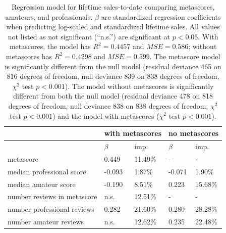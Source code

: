 \documentclass{sig-alternate}
\begin{document}
\begin{table}[tb]
\centering
\small
\sffamily

\begin{tabularx}{\linewidth}{llXlX}
& \multicolumn{2}{c}{\textbf{with metascores}} & \multicolumn{2}{c}{\textbf{no metascores}}\\ 
\midrule & \textbf{$\beta$} & imp. & \textbf{$\beta$} & imp.\\ 
metascore & 0.449 & 11.49\% & - & - \\ 
median professional score & -0.093 & 1.87\% & -0.071 & 1.90\% \\ 
median amateur score & -0.190 & 8.51\% & 0.223 & 15.68\% \\ 
number reviews in metascore & n.s. & 12.51\% & - & - \\ 
number professional reviews & 0.282 & 21.60\% & 0.280 & 28.28\% \\ 
number amateur reviews & n.s. & 12.62\% & 0.235 & 22.48\% \\ 

\end{tabularx}
\caption{Regression model for lifetime sales-to-date comparing metascores, amateurs, and professionals. $\beta$ are standardized regression coefficients when predicting log-scaled and standardized lifetime sales. All values not listed as not significant (``n.s.'') are significant at $p < 0.05$. 
With metascores, the model has $R^2 = 0.4457$ and $MSE = 0.586$; without metascores has $R^2 = 0.4298$ and $MSE = 0.599$. 
The metascore model is significantly different from the null model (residual deviance 465 on 816 degrees of freedom, null deviance 839 on 838 degrees of freedom, $\chi^2$ test $p < 0.001$). The model without metascores is significantly different from both the null model (residual deviance 478 on 818 degrees of freedom, null deviance 838 on 838 degrees of freedom, $\chi^2$ test $p < 0.001$) and the model with metascores ($\chi^2$ test $p < 0.001$).
}
\label{tab:sales_metascore_lm}
\end{table}
\end{document}
